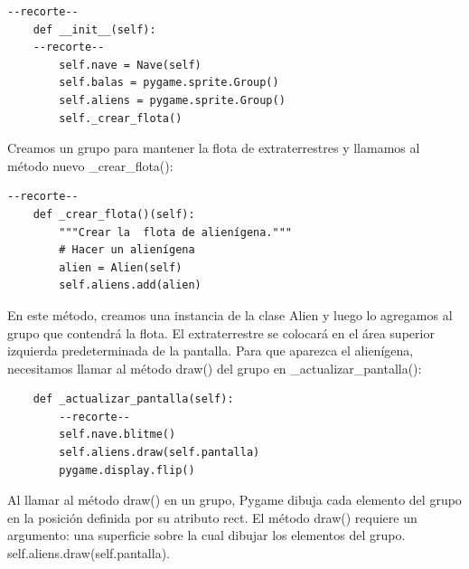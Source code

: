 \hspace{-2.4cm}{\ttfamily \scriptsize invasión}

\vspace{-0.2cm}
\hspace{-2.1cm}{\ttfamily \scriptsize \_alien.py}\vspace{-0.84cm}
\begin{lstlisting}
--recorte--			
    def __init__(self):
    --recorte--
        self.nave = Nave(self)
        self.balas = pygame.sprite.Group()
        self.aliens = pygame.sprite.Group()
        self._crear_flota()
\end{lstlisting}
\noindent Creamos un grupo para mantener la flota de extraterrestres y llamamos al  método  nuevo  {\ttfamily \_crear\_flota()}:

\hspace{-2.4cm}{\ttfamily \scriptsize invasión}

\vspace{-0.2cm}
\hspace{-2.1cm}{\ttfamily \scriptsize \_alien.py}\vspace{-0.84cm}
\begin{lstlisting}		
--recorte--
    def _crear_flota()(self):
        """Crear la  flota de alienígena."""
        # Hacer un alienígena
        alien = Alien(self)
        self.aliens.add(alien)
\end{lstlisting}
En este método, creamos una instancia de la clase  {\ttfamily Alien} y luego lo agregamos al grupo que contendrá la flota. 
El extraterrestre se colocará en el área superior izquierda predeterminada de la pantalla. 
Para que aparezca el alienígena, necesitamos llamar al método {\ttfamily draw()} del grupo en {\ttfamily \_actualizar\_pantalla()}:

\hspace{-2.4cm}{\ttfamily \scriptsize invasión}

\vspace{-0.2cm}
\hspace{-2.1cm}{\ttfamily \scriptsize \_alien.py}\vspace{-0.84cm}
\begin{lstlisting}		
    def _actualizar_pantalla(self):
        --recorte--
        self.nave.blitme()
        self.aliens.draw(self.pantalla)
        pygame.display.flip()
\end{lstlisting}


Al  llamar al  método {\ttfamily draw()} en un grupo, Pygame dibuja cada elemento del grupo en la posición definida por su atributo {\ttfamily rect}. El método  {\ttfamily draw()}  requiere un argumento: una superficie sobre la cual dibujar los elementos del grupo. 
{\ttfamily self.aliens.draw(self.pantalla)}.


